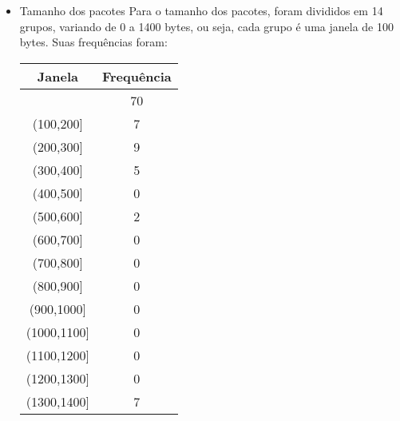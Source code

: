 \documentclass[11pt,a4paper]{book}
\begin{document}
\begin{enumerate}
\begin{itemize}
					A Figura~\ref{fig:fig1}, mostra a distribuição em relação aos protocolos.
					
					\begin{figure}[t]
						\centering
						\texttt{[image: prot.png]}
						\label{fig:fig1}
						\caption{Protocolos}
					\end{figure}
					
				\item Tamanho dos pacotes
					Para o tamanho dos pacotes, foram divididos em 14 grupos, variando de 0 a 1400 bytes, ou seja, cada grupo é uma janela de 100 bytes.
					Suas frequências foram: 
					\begin{tabular}{|c|c|}
						\hline
						Janela & Frequência\\
						\hline
						[0,100] & 70\\
						\hline
						(100,200] & 7\\
						\hline
						(200,300] & 9\\
						\hline
						(300,400] & 5\\
						\hline
						(400,500] & 0\\
						\hline
						(500,600] & 2\\
						\hline
						(600,700] & 0\\
						\hline
						(700,800] & 0\\
						\hline
						(800,900] & 0\\
						\hline
						(900,1000] & 0\\
						\hline
						(1000,1100] & 0\\
						\hline
						(1100,1200] & 0\\
						\hline
						(1200,1300] & 0\\
						\hline
						(1300,1400] & 7\\
						\hline
					\end{tabular}
					

\end{itemize}
\end{enumerate}
\end{document}
